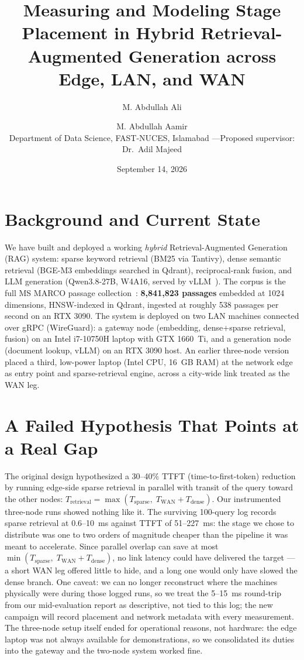\documentclass[10pt]{article}
\title{\textbf{Measuring and Modeling Stage Placement in Hybrid Retrieval-Augmented Generation across Edge, LAN, and WAN}}
\author{M. Abdullah Ali \and M. Abdullah Aamir\\
\small Department of Data Science, FAST-NUCES, Islamabad \quad---\quad Proposed supervisor: Dr.~Adil Majeed}
\date{September 14, 2026}
\begin{document}
\maketitle
\vspace{-9mm}

\section{Background and Current State}
We have built and deployed a working \emph{hybrid} Retrieval-Augmented Generation (RAG) system:
sparse keyword retrieval (BM25 via Tantivy), dense semantic retrieval (BGE-M3 embeddings searched
in Qdrant), reciprocal-rank fusion, and LLM generation (Qwen3.8-27B, W4A16, served by
vLLM~\cite{vllm,bgem3}). The corpus is the full MS MARCO passage collection~\cite{msmarco}:
\textbf{8{,}841{,}823 passages} embedded at 1024 dimensions, HNSW-indexed in Qdrant, ingested at
roughly 538 passages per second on an RTX 3090. The system is deployed on two LAN machines
connected over gRPC (WireGuard): a gateway node (embedding, dense+sparse retrieval, fusion) on an
Intel i7-10750H
laptop with GTX 1660~Ti, and a generation node (document lookup, vLLM) on an RTX 3090 host. An
earlier three-node version placed a third, low-power laptop (Intel CPU, 16~GB RAM) at the network
edge as entry point and sparse-retrieval engine, across a city-wide link treated as the WAN leg.

\section{A Failed Hypothesis That Points at a Real Gap}
The original design hypothesized a 30--40\% TTFT (time-to-first-token) reduction by running
edge-side sparse retrieval in parallel with transit of the query toward the other nodes:
$T_{\mathrm{retrieval}} = \max(T_{\mathrm{sparse}},\; T_{\mathrm{WAN}} + T_{\mathrm{dense}})$.
Our instrumented three-node runs showed nothing like it. The surviving 100-query log records
sparse retrieval at 0.6--10~ms against TTFT of 51--227~ms: the stage we chose to distribute was
one to two orders of magnitude cheaper than the pipeline it was meant to accelerate. Since
parallel overlap can save at most
$\min(T_{\mathrm{sparse}},\; T_{\mathrm{WAN}} + T_{\mathrm{dense}})$, no link latency could have
delivered the target --- a short WAN leg offered little to hide, and a long one would only have
slowed the dense branch. One caveat: we can no longer reconstruct where the machines physically
were during those logged runs, so we treat the 5--15~ms round-trip from our mid-evaluation report
as descriptive, not tied to this log; the new campaign will record placement and network metadata
with every measurement. The three-node setup
itself ended for operational reasons, not hardware: the edge laptop was not always available for
demonstrations, so we consolidated its duties into the gateway and the two-node system worked
fine.
\end{document}
